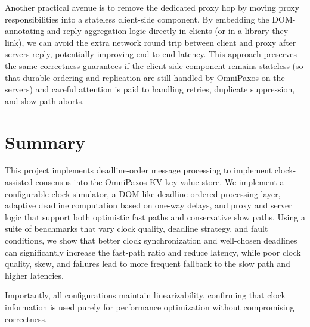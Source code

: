 \documentclass{article}
\begin{document}
Another practical avenue is to remove the dedicated proxy hop by moving proxy responsibilities into a stateless client-side component. By embedding the DOM-annotating and reply-aggregation logic directly in clients (or in a library they link), we can avoid the extra network round trip between client and proxy after servers reply, potentially improving end-to-end latency. This approach preserves the same correctness guarantees if the client-side component remains stateless (so that durable ordering and replication are still handled by OmniPaxos on the servers) and careful attention is paid to handling retries, duplicate suppression, and slow-path aborts.



\section{Summary}
This project implements deadline-order message processing to implement clock-assisted consensus into the OmniPaxos-KV key-value store. We implement a configurable clock simulator, a DOM-like deadline-ordered processing layer, adaptive deadline computation based on one-way delays, and proxy and server logic that support both optimistic fast paths and conservative slow paths. Using a suite of benchmarks that vary clock quality, deadline strategy, and fault conditions, we show that better clock synchronization and well-chosen deadlines can significantly increase the fast-path ratio and reduce latency, while poor clock quality, skew, and failures lead to more frequent fallback to the slow path and higher latencies. 

Importantly, all configurations maintain linearizability, confirming that clock information is used purely for performance optimization without compromising correctness.
\end{document}
